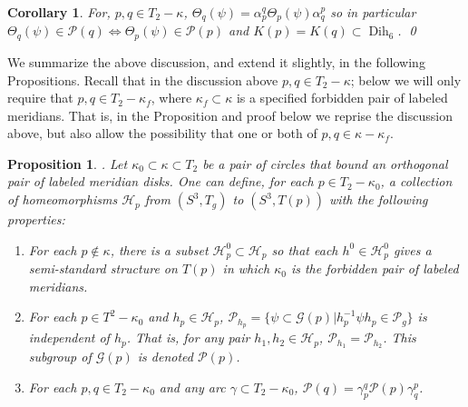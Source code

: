 \documentclass[12pt]{amsart}
\newtheorem{cor}[thm]{Corollary}
\newtheorem{prop}[thm]{Proposition}
\newcommand{\calG}{\mathcal G}
\newcommand{\calP}{\mathcal P}
\newcommand{\calH}{\mathcal H}
\newcommand{\Dih}{\operatorname{Dih}}
\begin{document}
\begin{cor} \label{cor:PpPq} For, $p, q \in T_2 - \kappa$, $\Theta_q(\psi) = \alpha_p^q \Theta_p(\psi) \alpha_q^p$ so in particular 
$\Theta_q(\psi) \in \calP(q) \iff \Theta_p(\psi) \in \calP(p)$ and $K(p) = K(q) \subset \Dih_6$.  \qed
\end{cor}


We summarize the above discussion, and extend it slightly, in the following Propositions.  Recall that in the discussion above $p, q \in T_2 - \kappa$; below we will only require that $p, q \in T_2 - \kappa_f$, where $\kappa_f \subset \kappa$ is a specified forbidden pair of labeled meridians.  That is, in the Proposition and proof below we reprise the discussion above, but also allow the possibility that one or both of $p, q \in \kappa - \kappa_f$.

\begin{prop}. \label{prop:thetastar}  Let $\kappa_0 \subset \kappa \subset T_2$ be a pair of circles that bound an orthogonal pair of labeled meridian disks.  One can define, for each $p \in T_2 - \kappa_0$, a collection of homeomorphisms $\calH_p$ from $(S^3, T_g)$ to $(S^3, T(p))$ with the following properties:
\begin{enumerate}
\item For each $p \notin \kappa$, there is a subset $\calH_p^0 \subset \calH_p$ so that each $h^0 \in \calH_p^0$ gives a semi-standard structure on $T(p)$ in which $\kappa_0$ is the forbidden pair of labeled meridians.
\item For each $p \in T^2 - \kappa_0$ and $h_p \in \calH_p$, $\calP_{h_p} = \{\psi \subset \calG(p) | h_p^{-1} \psi h_p \in \calP_g\}$ is independent of $h_p$.  That is, for any pair $h_1, h_2 \in \calH_p$, $\calP_{h_1} = \calP_{h_2}$.  This subgroup of $\calG(p)$ is denoted $\calP(p)$.  
\item For each $p, q \in T_2 - \kappa_0$ and any arc $\gamma \subset T_2 - \kappa_0$, $\calP(q) = \gamma_p^q \calP(p) \gamma_q^p$.
\end{enumerate}
\end{prop}
\end{document}

